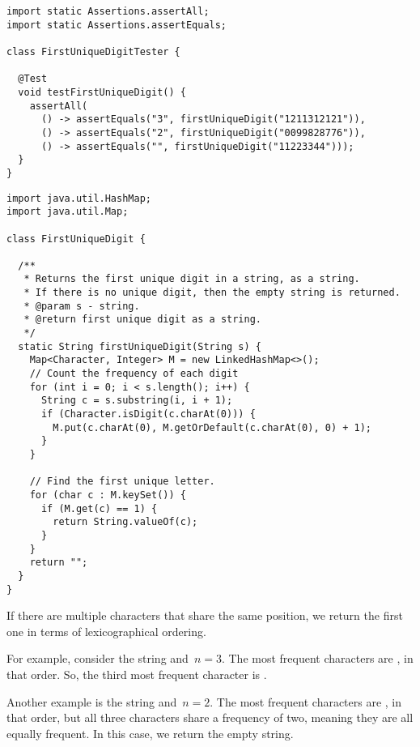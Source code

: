 \begin{lstlisting}[language=MyJava]
import static Assertions.assertAll;
import static Assertions.assertEquals;

class FirstUniqueDigitTester {

  @Test
  void testFirstUniqueDigit() {
    assertAll(
      () -> assertEquals("3", firstUniqueDigit("1211312121")),
      () -> assertEquals("2", firstUniqueDigit("0099828776")),
      () -> assertEquals("", firstUniqueDigit("11223344")));
  }
}
\end{lstlisting}

\begin{lstlisting}[language=MyJava]
import java.util.HashMap;
import java.util.Map;

class FirstUniqueDigit {

  /**
   * Returns the first unique digit in a string, as a string. 
   * If there is no unique digit, then the empty string is returned.
   * @param s - string.
   * @return first unique digit as a string.
   */
  static String firstUniqueDigit(String s) {
    Map<Character, Integer> M = new LinkedHashMap<>();
    // Count the frequency of each digit
    for (int i = 0; i < s.length(); i++) {
      String c = s.substring(i, i + 1);
      if (Character.isDigit(c.charAt(0))) {
        M.put(c.charAt(0), M.getOrDefault(c.charAt(0), 0) + 1);
      }
    }

    // Find the first unique letter.
    for (char c : M.keySet()) {
      if (M.get(c) == 1) {
        return String.valueOf(c);
      }
    }
    return "";
  }
}
\end{lstlisting}

If there are multiple characters that share the same position, we return the first one in terms of lexicographical ordering.

For example, consider the string  and~$n=3$. 
The most frequent characters are , in that order.
So, the third most frequent character is .

Another example is the string  and~$n=2$. 
The most frequent characters are , in that order, but all three characters share a frequency of two, meaning they are all equally frequent. 
In this case, we return the empty string.

